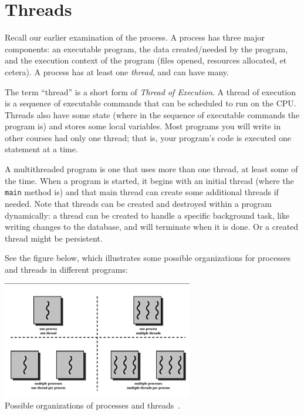 




\section*{Threads}

Recall our earlier examination of the process. A process has three major components: an executable program, the data created/needed by the program, and the execution context of the program (files opened, resources allocated, et cetera). A process has at least one \textit{thread}, and can have many.

The term ``thread'' is a short form of \textit{Thread of Execution}. A thread of execution is a sequence of executable commands that can be scheduled to run on the CPU. Threads also have some state (where in the sequence of executable commands the program is) and stores some local variables. Most programs you will write in other courses had only one thread; that is, your program's code is executed one statement at a time.

A multithreaded program is one that uses more than one thread, at least some of the time. When a program is started, it begins with an initial thread (where the \texttt{main} method is) and that main thread can create some additional threads if needed. Note that threads can be created and destroyed within a program dynamically: a thread can be created to handle a specific background task, like writing changes to the database, and will terminate when it is done. Or a created thread might be persistent.

See the figure below, which illustrates some possible organizations for processes and threads in different programs:

\begin{center}
	\includegraphics[width=0.625\textwidth]{images/mthread.png}\\
	Possible organizations of processes and threads~\cite{mthread}.
\end{center}

